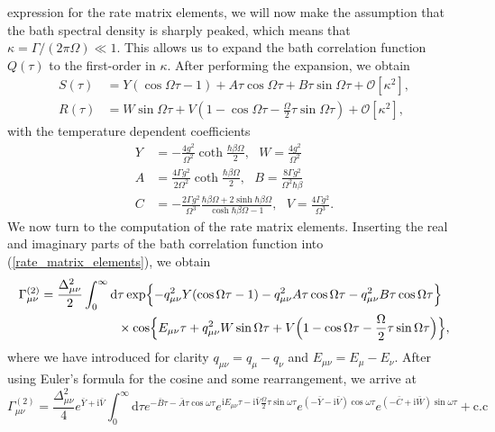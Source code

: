 expression for the rate matrix elements, we will now make the assumption that the bath 
spectral density is sharply peaked, which means that $\kappa=\Gamma/(2\pi\Omega)\ll1$.
This allows us to expand the bath correlation function $Q(\tau)$ to the first-order in $\kappa$.
After performing the expansion, we obtain
%
\begin{align}
    S(\tau) &= Y(\cos \Omega \tau - 1)+A \tau \cos \Omega \tau +B \tau \sin \Omega \tau
    + \mathcal{O}\left[\kappa^2\right], \\
    R(\tau) &= W\sin\Omega\tau+V(1-\cos\Omega\tau-\frac{\Omega}{2}\tau\sin\Omega\tau)
    + \mathcal{O}\left[\kappa^2\right],
\end{align}
%
with the temperature dependent coefficients
%
\begin{align}
    Y &= -\frac{4g^2}{\Omega^2}\coth\frac{\hbar\beta\Omega}{2}, \ \ \ W = \frac{4g^2}{\Omega^2} \\
    A &= \frac{4\Gamma g^2}{2\Omega^2}\coth\frac{\hbar\beta\Omega}{2}, \ \ \ B = \frac{8\Gamma g^2}{\Omega^2\hbar\beta} \\
    C &= -\frac{2\Gamma g^2}{\Omega^3}\frac{\hbar\beta\Omega +2\sinh\hbar\beta\Omega}{\cosh\hbar\beta\Omega-1}, \ \ \ V = \frac{4\Gamma g^2}{\Omega^3}.
\end{align}
%
We now turn to the computation of the rate matrix elements.
Inserting the real and imaginary parts of the bath correlation function into (\ref{rate_matrix_elements}),
we obtain
%
\begin{equation}
\begin{split}
    \Gamma_{\mu\nu}^{(2)} = \frac{\Delta_{\mu\nu}^2}{2} \int_{0}^{\infty} \text{d} & \tau 
    \exp \Bigl\{-q_{\mu\nu}^2 Y(\cos\Omega\tau-1) -q_{\mu\nu}^2 A\tau\cos\Omega\tau
    - q_{\mu\nu}^2 B\tau\cos\Omega\tau \Bigr\} \\
    & \times \cos \Bigl\{ E_{\mu\nu} \tau + q_{\mu\nu}^2 W\sin\Omega\tau + 
    V \Bigl( 1-\cos\Omega\tau -\frac{\Omega}{2}\tau \sin\Omega\tau \Bigr) \Bigr\},
\end{split}
\end{equation}
%
where we have introduced for clarity $q_{\mu\nu}=q_\mu - q_\nu$ and $E_{\mu\nu}=E_\mu - E_\nu$.
After using Euler's formula for the cosine and some rearrangement, we arrive at
%
\begin{equation}
    \Gamma_{\mu\nu}^{(2)} = \frac{\Delta_{\mu\nu}^2}{4} e^{ \bar{Y} + \text{i} \bar{V}} \int_{0}^{\infty} \text{d}\tau
    e^{- \bar{B} \tau -\bar{A} \tau \cos\omega\tau}
    e^{\text{i}E_{\mu\nu}\tau-\text{i}\bar{V} \frac{\Omega}{2} \tau\sin\omega\tau}
    e^{(-\bar{Y}-\text{i}\bar{V})\cos\omega\tau}
    e^{(-\bar{C}+\text{i}\bar{W})\sin\omega\tau} + \text{c.c}
\end{equation}

